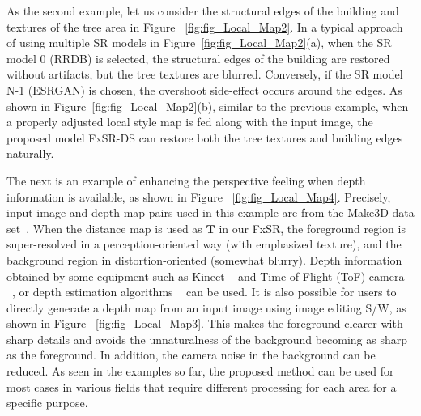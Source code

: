 \documentclass{article}
\begin{document}
As the second example, let us consider the structural edges of the building and textures of the tree area in Figure ~\ref{fig:fig_Local_Map2}. In a typical approach of using multiple SR models in Figure~\ref{fig:fig_Local_Map2}(a), when the SR model 0 (RRDB) is selected, the structural edges of the building are restored without artifacts, but the tree textures are blurred. Conversely, if the SR model N-1 (ESRGAN) is chosen, the overshoot side-effect occurs around the edges. As shown in Figure~\ref{fig:fig_Local_Map2}(b), similar to the previous example, when a properly adjusted local style map is fed along with the input image, the proposed model FxSR-DS can restore both the tree textures and building edges naturally.

The next is an example of enhancing the perspective feeling when depth information is available, as shown in Figure ~\ref{fig:fig_Local_Map4}. Precisely, input image and depth map pairs used in this example are from the Make3D data set~\cite{saxena2005learning, saxena20083}. When the distance map is used as $\mathbf{T}$ in our FxSR, the foreground region is super-resolved in a perception-oriented way (with emphasized texture), and the background region in distortion-oriented (somewhat blurry). Depth information obtained by some equipment such as Kinect ~\cite{izadi2011kinectfusion} and Time-of-Flight (ToF) camera ~\cite{cui2012algorithms, cui20103d}, or depth estimation algorithms ~\cite{ming2021deep} can be used. It is also possible for users to directly generate a depth map from an input image using image editing S/W, as shown in Figure ~\ref{fig:fig_Local_Map3}. This makes the foreground clearer with sharp details and avoids the unnaturalness of the background becoming as sharp as the foreground. In addition, the camera noise in the background can be reduced. As seen in the examples so far, the proposed method can be used for most cases in various fields that require different processing for each area for a specific purpose.
\end{document}
